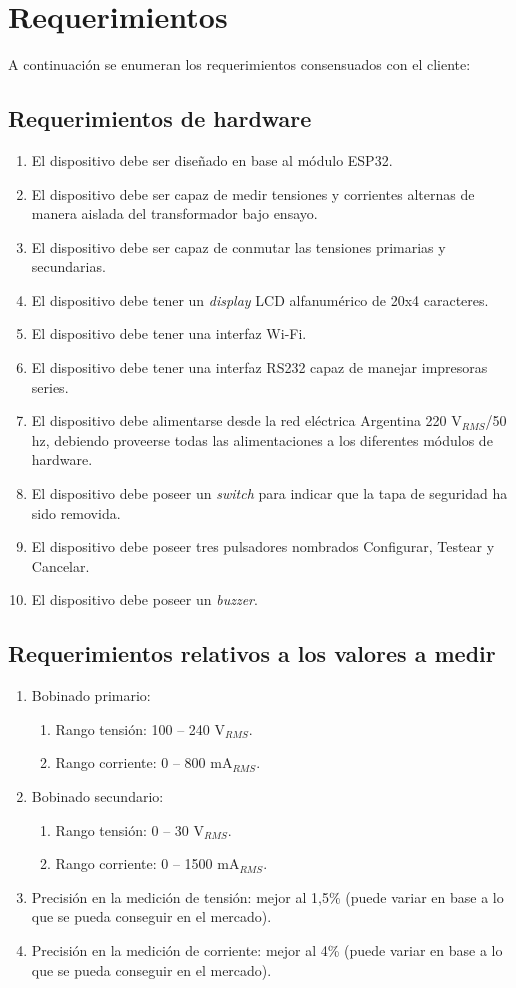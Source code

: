 \section{Requerimientos}

A continuación se enumeran los requerimientos consensuados con el cliente:

\subsection{Requerimientos de hardware}
	\begin{enumerate}
	\item El dispositivo debe ser diseñado en base al módulo ESP32.
	\item El dispositivo debe ser capaz de medir tensiones y corrientes alternas de manera aislada del transformador bajo ensayo.
	\item El dispositivo debe ser capaz de conmutar las tensiones primarias y secundarias.
	\item El dispositivo debe tener un \textit{display} LCD alfanumérico de 20x4 caracteres.
	\item El dispositivo debe tener una interfaz Wi-Fi.
	\item El dispositivo debe tener una interfaz RS232 capaz de manejar impresoras series.
	\item El dispositivo debe alimentarse desde la red eléctrica Argentina 220 V$_{RMS}$/50 hz, debiendo proveerse todas las alimentaciones a los diferentes módulos de hardware.
	\item El dispositivo debe poseer un \textit{switch} para indicar que la tapa de seguridad ha sido removida.
	\item El dispositivo debe poseer tres pulsadores nombrados Configurar, Testear y Cancelar.
	\item El dispositivo debe poseer un \textit{buzzer}.
	\end{enumerate}
\subsection{Requerimientos relativos a los valores a medir}
	\begin{enumerate}
	\item Bobinado primario:
		\begin{enumerate}
		\item Rango tensión: 100 – 240 V$_{RMS}$.
		\item Rango corriente: 0 – 800 mA$_{RMS}$.
		\end{enumerate}
	\item Bobinado secundario:
		\begin{enumerate}
		\item Rango tensión: 0 – 30 V$_{RMS}$.
		\item Rango corriente: 0 – 1500 mA$_{RMS}$.
		\end{enumerate}
	\item Precisión en la medición de tensión: mejor al 1,5\% (puede variar en base a lo que se pueda conseguir en el mercado).
	\item Precisión en la medición de corriente: mejor al 4\% (puede variar en base a lo que se pueda conseguir en el mercado).
	\end{enumerate}
